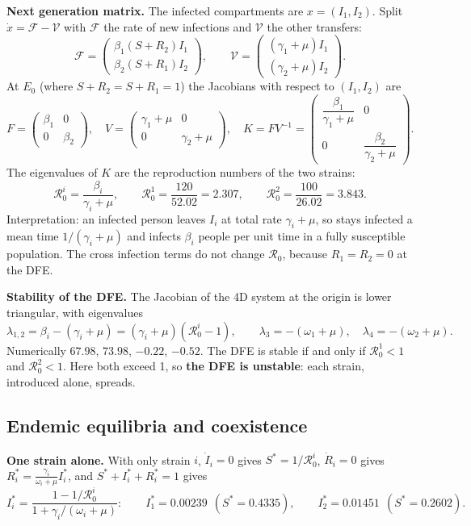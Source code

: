 \documentclass[11pt,a4paper]{article}
\newcommand{\hl}[1]{{\bfseries\color{aimsred}#1}}
\newcommand{\R}{\mathcal R_0}
\begin{document}
\textbf{Next generation matrix.} The infected compartments are $x=(I_1,I_2)$. Split $\dot x=\mathcal F-\mathcal V$ with $\mathcal F$ the rate of new infections and $\mathcal V$ the other transfers:
\[
\mathcal F=\begin{pmatrix}\beta_1(S+R_2)I_1\\ \beta_2(S+R_1)I_2\end{pmatrix},\qquad
\mathcal V=\begin{pmatrix}(\gamma_1+\mu)I_1\\ (\gamma_2+\mu)I_2\end{pmatrix}.
\]
At $E_0$ (where $S+R_2=S+R_1=1$) the Jacobians with respect to $(I_1,I_2)$ are
\[
F=\begin{pmatrix}\beta_1&0\\0&\beta_2\end{pmatrix},\quad
V=\begin{pmatrix}\gamma_1+\mu&0\\0&\gamma_2+\mu\end{pmatrix},\quad
K=FV^{-1}=\begin{pmatrix}\dfrac{\beta_1}{\gamma_1+\mu}&0\\[6pt]0&\dfrac{\beta_2}{\gamma_2+\mu}\end{pmatrix}.
\]
The eigenvalues of $K$ are the reproduction numbers of the two strains:
\[
\boxed{\R^{i}=\frac{\beta_i}{\gamma_i+\mu}},\qquad
\R^1=\frac{120}{52.02}=2.307,\qquad \R^2=\frac{100}{26.02}=3.843 .
\]
Interpretation: an infected person leaves $I_i$ at total rate $\gamma_i+\mu$, so stays infected a mean time $1/(\gamma_i+\mu)$ and infects $\beta_i$ people per unit time in a fully susceptible population. The cross infection terms do not change $\R$, because $R_1=R_2=0$ at the DFE.

\textbf{Stability of the DFE.} The Jacobian of the 4D system at the origin is lower triangular, with eigenvalues
\[
\lambda_{1,2}=\beta_i-(\gamma_i+\mu)=(\gamma_i+\mu)(\R^i-1),\qquad \lambda_3=-(\omega_1+\mu),\quad\lambda_4=-(\omega_2+\mu).
\]
Numerically $67.98$, $73.98$, $-0.22$, $-0.52$. The DFE is stable if and only if $\R^1<1$ and $\R^2<1$. Here both exceed 1, so \hl{the DFE is unstable}: each strain, introduced alone, spreads.

\subsection{Endemic equilibria and coexistence}

\textbf{One strain alone.} With only strain $i$, $\dot I_i=0$ gives $S^*=1/\R^i$, $\dot R_i=0$ gives $R_i^*=\frac{\gamma_i}{\omega_i+\mu}I_i^*$, and $S^*+I_i^*+R_i^*=1$ gives
\[
I_i^*=\frac{1-1/\R^i}{1+\gamma_i/(\omega_i+\mu)}:\qquad I_1^*=0.00239\ \ (S^*=0.4335),\qquad I_2^*=0.01451\ \ (S^*=0.2602).
\]
\end{document}
